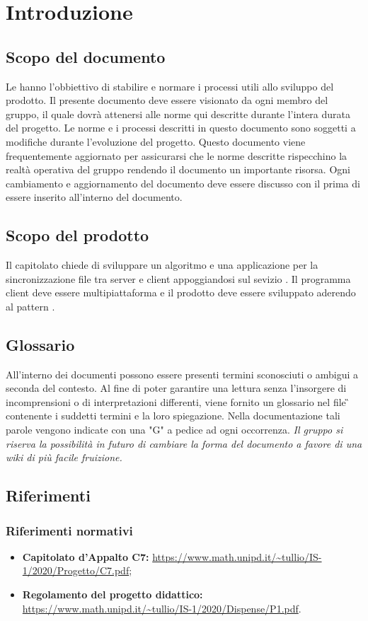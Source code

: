 \section{Introduzione}
\subsection{Scopo del documento}
Le \NdP{} hanno l'obbiettivo di stabilire e normare i processi utili allo sviluppo del prodotto.
Il presente documento deve essere visionato da ogni membro del gruppo, il quale dovrà attenersi alle norme qui descritte durante l'intera durata del progetto.
Le norme e i processi descritti in questo documento sono soggetti a modifiche durante l'evoluzione del progetto.
Questo documento viene frequentemente aggiornato per assicurarsi che le norme descritte rispecchino la realtà operativa del gruppo rendendo il documento un importante risorsa.
Ogni cambiamento e aggiornamento del documento deve essere discusso con il \RdP{} prima di essere inserito all'interno del documento.
\subsection{Scopo del prodotto}
Il capitolato chiede di sviluppare un algoritmo e una applicazione per la sincronizzazione file tra server e client appoggiandosi sul sevizio .
Il programma client deve essere multipiattaforma e il prodotto deve essere sviluppato aderendo al pattern .
\subsection{Glossario}
All'interno dei documenti possono essere presenti termini sconosciuti o ambigui a seconda del contesto. Al fine di poter garantire una lettura senza l'insorgere di incomprensioni o di interpretazioni differenti, viene fornito un glossario nel file \G{} contenente i suddetti termini e la loro spiegazione. Nella documentazione tali parole vengono indicate con una "G" a pedice ad ogni occorrenza. \newline
\textit{Il gruppo si riserva la possibilità in futuro di cambiare la forma del documento a favore di una wiki di più facile fruizione.}
\subsection{Riferimenti}
\subsubsection{Riferimenti normativi}
\begin{itemize}
	\item \textbf{Capitolato d'Appalto C7:} \url{https://www.math.unipd.it/~tullio/IS-1/2020/Progetto/C7.pdf};
	\item \textbf{Regolamento del progetto didattico:} \url{https://www.math.unipd.it/~tullio/IS-1/2020/Dispense/P1.pdf}.
\end{itemize}
